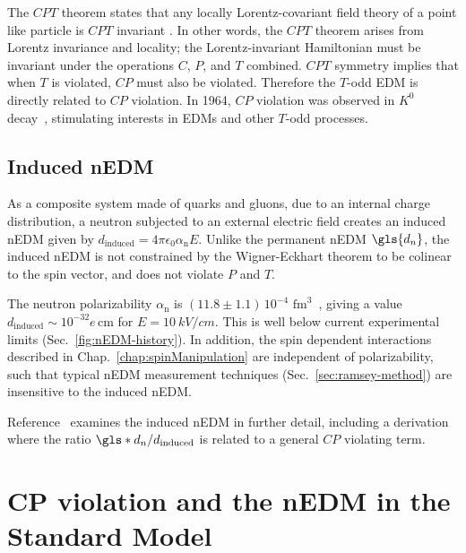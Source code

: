 The $CPT$ theorem states that any locally Lorentz-covariant field theory of a point like particle is $CPT$ invariant \cite{LUDERS19571, schmidt-wellenburg_quest_2017, cp_violation_wo_strangeness}. In other words, the $CPT$ theorem arises from Lorentz invariance and locality; the Lorentz-invariant Hamiltonian must be invariant under the operations $C$, $P$, and $T$ combined. $CPT$ symmetry implies that when $T$ is violated, $CP$ must also be violated. Therefore the $T$-odd EDM is directly related to $CP$ violation. In 1964, $CP$ violation was observed in $K^0$ decay~\cite{christenson_1964}, stimulating interests in EDMs and other $T$-odd processes.


\subsection{Induced nEDM}


As a composite system made of quarks and gluons, due to an internal charge distribution, a neutron subjected to an external electric field creates an induced nEDM given by $d_\text{induced}=4\pi \epsilon_0 \alpha_\text{n} E$. Unlike the permanent nEDM $\gls{d_n}$, the induced nEDM is not constrained by the Wigner-Eckhart theorem to be colinear to the spin vector, and does not violate $P$ and $T$.

The neutron polarizability $\alpha_\text{n}$ is $(11.8\pm 1.1)\,10^{-4}\text{ fm}^3$~\cite{pdg2022}, giving a value $d_\text{induced}\sim 10^{-32}e\,\text{cm}$ for $E=\qty{10}{kV\per cm}$. This is well below current experimental limits (Sec.~\ref{fig:nEDM-history}). In addition, the spin dependent interactions described in Chap.~\ref{chap:spinManipulation} are independent of polarizability, such that typical nEDM measurement techniques (Sec.~\ref{sec:ramsey-method}) are insensitive to the induced nEDM. 

Reference~\cite{baym_elementary_2016} examines the induced nEDM in further detail, including a derivation where the ratio $\gls*{d_n}/d_\text{induced}$ is related to a general $CP$ violating term.


\section{CP violation and the nEDM in the Standard Model}\label{sec:CP_violation_SM}

